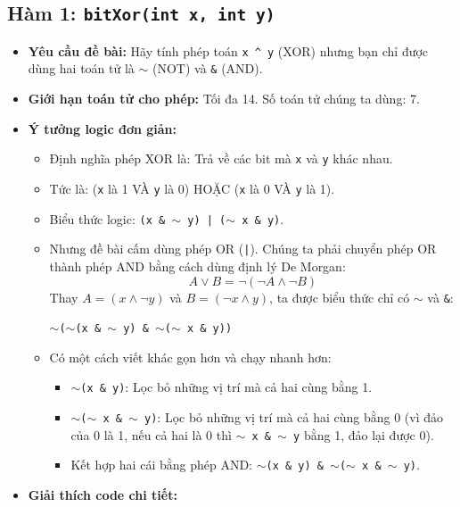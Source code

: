 \documentclass[12pt, a4paper]{article}
\begin{document}
\subsection{Hàm 1: \texttt{bitXor(int x, int y)}}
\begin{itemize}
    \item \textbf{Yêu cầu đề bài:} Hãy tính phép toán \texttt{x \textasciicircum\ y} (XOR) nhưng bạn chỉ được dùng hai toán tử là \texttt{\(\sim\)} (NOT) và \texttt{\&} (AND).
    \item \textbf{Giới hạn toán tử cho phép:} Tối đa 14. Số toán tử chúng ta dùng: 7.
    \item \textbf{Ý tưởng logic đơn giản:}
    \begin{itemize}
        \item Định nghĩa phép XOR là: Trả về các bit mà \texttt{x} và \texttt{y} khác nhau.
        \item Tức là: (\texttt{x} là 1 VÀ \texttt{y} là 0) HOẶC (\texttt{x} là 0 VÀ \texttt{y} là 1).
        \item Biểu thức logic: \texttt{(x \& \(\sim\) y) | (\(\sim\) x \& y)}.
        \item Nhưng đề bài cấm dùng phép OR (\texttt{|}). Chúng ta phải chuyển phép OR thành phép AND bằng cách dùng định lý De Morgan:
        \[ A \lor B = \neg(\neg A \land \neg B) \]
        Thay $A = (x \land \neg y)$ và $B = (\neg x \land y)$, ta được biểu thức chỉ có \texttt{\(\sim\)} và \texttt{\&}:
        
        \texttt{\(\sim\)(\(\sim\)(x \& \(\sim\) y) \& \(\sim\)(\(\sim\) x \& y))}
        \item Có một cách viết khác gọn hơn và chạy nhanh hơn:
        \begin{itemize}
            \item \texttt{\(\sim\)(x \& y)}: Lọc bỏ những vị trí mà cả hai cùng bằng 1.
            \item \texttt{\(\sim\)(\(\sim\) x \& \(\sim\) y)}: Lọc bỏ những vị trí mà cả hai cùng bằng 0 (vì đảo của 0 là 1, nếu cả hai là 0 thì \texttt{\(\sim\) x \& \(\sim\) y} bằng 1, đảo lại được 0).
            \item Kết hợp hai cái bằng phép AND: \texttt{\(\sim\)(x \& y) \& \(\sim\)(\(\sim\) x \& \(\sim\) y)}.
        \end{itemize}
    \end{itemize}
    \item \textbf{Giải thích code chi tiết:}



\end{itemize}
\end{document}
